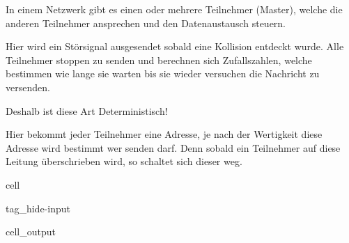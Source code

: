 \documentclass[letterpaper,10pt,english]{jupyterBook}
\begin{document}
\begin{DUlineblock}{0em}
\item[] 
\end{DUlineblock}

\sphinxAtStartPar
In einem Netzwerk gibt es einen oder mehrere Teilnehmer (Master), welche die anderen Teilnehmer ansprechen
und den Datenaustausch steuern.

\begin{DUlineblock}{0em}
\item[] 
\end{DUlineblock}

\sphinxAtStartPar
Hier wird ein Störsignal ausgesendet sobald eine Kollision entdeckt wurde.
Alle Teilnehmer stoppen zu senden und berechnen sich Zufallszahlen,
welche bestimmen wie lange sie warten bis sie wieder versuchen die Nachricht zu versenden.

\sphinxAtStartPar
Deshalb ist diese Art  Deterministisch!

\begin{DUlineblock}{0em}
\item[] 
\end{DUlineblock}

\sphinxAtStartPar
Hier bekommt jeder Teilnehmer eine Adresse,
je nach der Wertigkeit diese Adresse wird bestimmt wer senden darf.
Denn sobald ein Teilnehmer auf diese Leitung überschrieben wird, so schaltet sich dieser weg.

\begin{sphinxuseclass}{cell}
\begin{sphinxuseclass}{tag_hide-input}\begin{sphinxVerbatimOutput}

\begin{sphinxuseclass}{cell_output}
\begin{sphinxVerbatim}[commandchars=\\\{\}]
\PYGZsq{}\PYGZsq{}
\end{sphinxVerbatim}

\noindent{}

\end{sphinxuseclass}\end{sphinxVerbatimOutput}

\end{sphinxuseclass}
\end{sphinxuseclass}
\begin{DUlineblock}{0em}
\item[] 
\end{DUlineblock}
\end{document}
